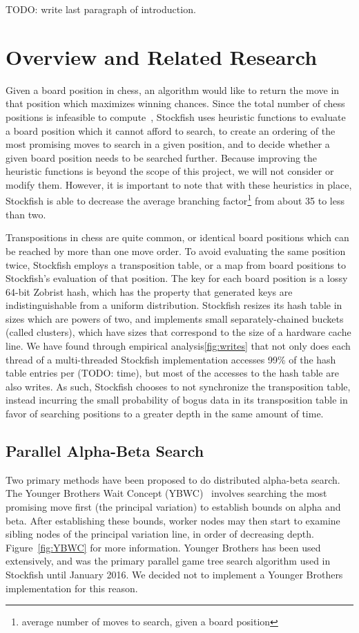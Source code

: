 \documentclass{article}
\begin{document}
TODO: write last paragraph of introduction.

\section{Overview and Related Research} \label{Overview}
Given a board position in chess, an algorithm would like to return the move in
that position which maximizes winning chances. Since the total number of chess
positions is infeasible to compute~\cite{???}, Stockfish uses heuristic
functions to evaluate a board position which it cannot afford to search, to create
an ordering of the most promising moves to search in a given position, and to
decide whether a given board position needs to be searched further. Because
improving the heuristic functions is beyond the scope of this project, we will
not consider or modify them. However, it is important to note that with these
heuristics in place, Stockfish is able to decrease the average branching
factor\footnote{average number of moves to search, given a board position} from
about 35 to less than two\cite{???}.

Transpositions in chess are quite common, or identical board positions which can
be reached by more than one move order. To avoid evaluating the same position
twice, Stockfish employs a transposition table, or a map from board positions to
Stockfish's evaluation of that position. The key for each board position is a lossy 64-bit
Zobrist hash\cite{Zobrist}, which has the property that generated keys are
indistinguishable from a uniform distribution. Stockfish resizes its hash table
in sizes which are powers of two, and implements small separately-chained buckets
(called clusters), which have sizes that correspond to the size of a hardware
cache line. We have found through empirical
analysis\ref{fig:writes} that not only does each thread of a multi-threaded Stockfish
implementation accesses 99\% of the hash table entries per (TODO: time), but
most of the accesses to the hash table are also writes. As such, Stockfish
chooses to not synchronize the transposition table, instead incurring
the small probability of bogus data in its transposition table in favor of
searching positions to a greater depth in the same amount of time.

\subsection{Parallel Alpha-Beta Search}
Two primary methods have been proposed to do distributed alpha-beta search. The
Younger Brothers Wait Concept (YBWC)~\cite{YBWC} involves searching the most
promising move first (the principal variation) to establish bounds on alpha and
beta. After establishing these bounds, worker nodes may then start to examine sibling
nodes of the principal variation line, in order of decreasing depth.
Figure~\ref{fig:YBWC} for more information. Younger Brothers has been used
extensively, and was the primary parallel game tree search algorithm used in
Stockfish until January 2016. We decided not to implement a Younger Brothers
implementation for this reason.
\end{document}
